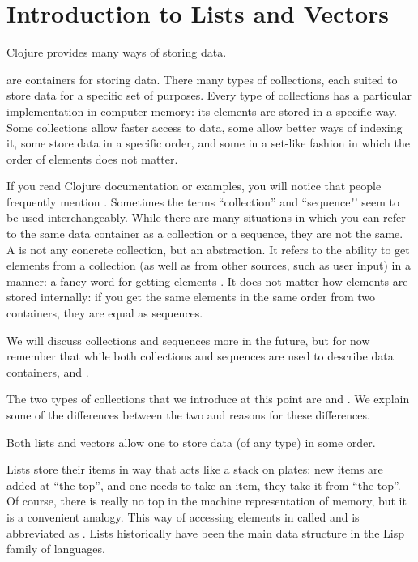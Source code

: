 \section{Introduction to Lists and Vectors}\label{sec:list-vectors}
Clojure provides many ways of storing data. 

  are containers for storing data. There many types of collections, each suited to store data for a specific set of purposes. Every type of collections has a particular implementation in computer memory: its elements are stored in a specific way. Some collections allow faster access to data, some allow better ways of indexing it, some store data in a specific order, and some in a set-like fashion in which the order of elements does not matter. 

If you read Clojure documentation or examples, you will notice that people frequently mention . Sometimes the terms ``collection'' and ``sequence"' seem to be used interchangeably. While there are many situations in which you can refer to the same data container as a collection or a sequence, they are not the same. A  is not any concrete collection, but an abstraction. It refers to the ability to get elements from a collection (as well as from other sources, such as user input) in a  manner: a fancy word for getting elements . It does not matter how elements are stored internally: if you get the same elements in the same order from two containers, they are equal as sequences.

We will discuss collections and sequences more in the future, but for now remember that while both collections and sequences are used to describe data containers,  and . 

The two types of collections that we introduce at this point are  and . We explain some of the differences between the two and reasons for these differences. 

Both lists and vectors allow one to store data (of any type) in some order. 

Lists store their items in way that acts like a stack on plates: new items are added at ``the top'', and one needs to take an item, they take it from ``the top''.  Of course, there is really no top in the machine representation of memory, but it is a convenient analogy.  This way of accessing elements in called  and is abbreviated as . Lists historically have been the main data structure in the Lisp family of languages. 

